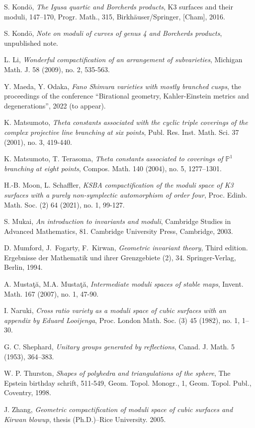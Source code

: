 \documentclass[12pt, pdftex]{amsart}
\theoremstyle{plain}
\theoremstyle{definition}
\numberwithin{equation}{section}
\def\P{{\mathbb P}}
\begin{document}
\begin{thebibliography}{99}
S. Kond\={o},
\textit{The Igusa quartic and Borcherds products},
K3 surfaces and their moduli, 147–170,
Progr. Math., 315, Birkhäuser/Springer, [Cham], 2016.

S. Kond\={o},
\textit{Note on moduli of curves of genus 4 and Borcherds products},
unpublished note.

L. Li,
\textit{Wonderful compactification of an arrangement of subvarieties},
Michigan Math. J. 58 (2009), no. 2, 535-563.



Y. Maeda, Y. Odaka,
\textit{Fano Shimura varieties with mostly branched cusps},
the proceedings of the conference “Birational geometry, Kahler-Einstein metrics and degenerations”, 2022 (to appear).

K. Matsumoto,
\textit{Theta constants associated with the cyclic triple coverings of the complex projective line branching at six points},
Publ. Res. Inst. Math. Sci. 37 (2001), no. 3, 419-440.

K. Matsumoto, T. Terasoma,
\textit{Theta constants associated to coverings of $\P^1$ branching at eight points},
Compos. Math. 140 (2004), no. 5, 1277–1301.


H.-B. Moon, L. Schaffler,
\textit{KSBA compactification of the moduli space of K3 surfaces with a purely non-symplectic automorphism of order four},
Proc. Edinb. Math. Soc. (2) 64 (2021), no. 1, 99-127.


S. Mukai,
\textit{An introduction to invariants and moduli},
Cambridge Studies in Advanced Mathematics, 81. Cambridge University Press, Cambridge, 2003.

D. Mumford, J.~Fogarty, F.~Kirwan,
\textit{Geometric invariant theory}, 
Third edition. Ergebnisse der Mathematik und ihrer Grenzgebiete (2), 34. Springer-Verlag, Berlin, 1994.

A. Mustaţă, M.A. Mustaţă,
\textit{Intermediate moduli spaces of stable maps},
Invent. Math. 167 (2007), no. 1, 47-90.

I. Naruki,
\textit{Cross ratio variety as a moduli space of cubic surfaces with an appendix by Eduard Looijenga},
Proc. London Math. Soc. (3) 45 (1982), no. 1, 1–30.

G. C. Shephard,
\textit{Unitary groups generated by reflections},
Canad. J. Math. 5 (1953), 364–383.

W. P. Thurston,
\textit{Shapes of polyhedra and triangulations of the sphere},
The Epstein birthday schrift, 511-549,
Geom. Topol. Monogr., 1, Geom. Topol. Publ., Coventry, 1998.

J. Zhang,
\textit{Geometric compactification of moduli space of cubic surfaces and Kirwan blowup}, 
thesis (Ph.D.)–Rice University. 2005.

\end{thebibliography}
\end{document}
